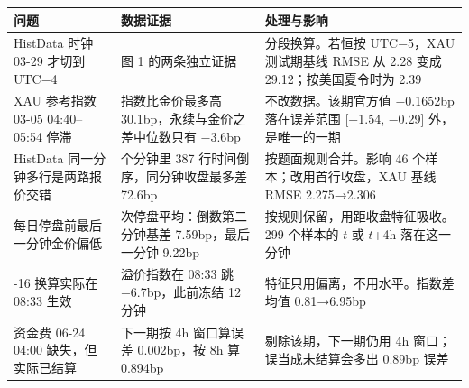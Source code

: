 \begin{tabular}{>{\raggedright\arraybackslash}p{4.3cm}>{\raggedright\arraybackslash}p{5.5cm}>{\raggedright\arraybackslash}p{6.9cm}}
\toprule
问题 & 数据证据 & 处理与影响 \\
\midrule
HistData 时钟 03-29 才切到 UTC−4 & 图 1 的两条独立证据 & 分段换算。若恒按 UTC−5，XAU 测试期基线 RMSE 从 2.28 变成 29.12；按美国夏令时为 2.39 \\
XAU 参考指数 03-05 04:40–05:54 停滞 & 指数比金价最多高 30.1bp，永续与金价之差中位数只有 −3.6bp & 不改数据。该期官方值 −0.1652bp 落在误差范围 [−1.54, −0.29] 外，是唯一的一期 \\
HistData 同一分钟多行是两路报价交错 & 732 个分钟里 387 行时间倒序，同分钟收盘最多差 72.6bp & 按题面规则合并。影响 46 个样本；改用首行收盘，XAU 基线 RMSE 2.275→2.306 \\
每日停盘前最后一分钟金价偏低 & 156 次停盘平均：倒数第二分钟基差 7.59bp，最后一分钟 9.22bp & 按规则保留，用距收盘特征吸收。299 个样本的 $t$ 或 $t$+4h 落在这一分钟 \\
07-16 换算实际在 08:33 生效 & 溢价指数在 08:33 跳 −6.7bp，此前冻结 12 分钟 & 特征只用偏离，不用水平。指数差均值 0.81→6.95bp \\
资金费 06-24 04:00 缺失，但实际已结算 & 下一期按 4h 窗口算误差 0.002bp，按 8h 算 0.894bp & 剔除该期，下一期仍用 4h 窗口；误当成未结算会多出 0.89bp 误差 \\
\bottomrule
\end{tabular}
